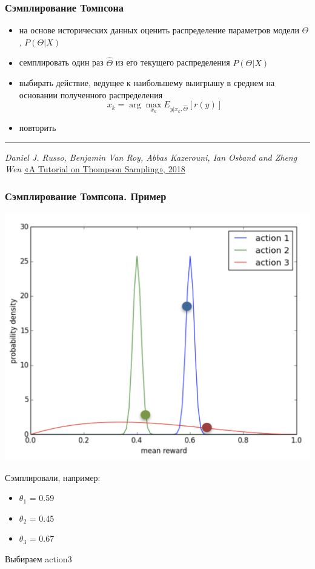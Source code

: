 \documentclass[fullscreen=true, bookmarks=true, hyperref={pdfencoding=unicode}]{beamer}
\begin{document}
\begin{frame}
  \frametitle{Сэмплирование Томпсона}

  \begin{itemize}
    \item на основе исторических данных оценить распределение параметров модели $\Theta$, $P(\Theta|X)$
    \item семплировать один раз $\hat \Theta$ из его текущего распределения $P(\Theta|X)$
    \item выбирать действие, ведущее к наибольшему выигрышу в среднем на основании полученного распределения $$ x_k = \arg\max_{x_k} E_{y|x_k, \hat \Theta} [r(y)]$$
    \item повторить
  \end{itemize}

  \vspace{1cm}

  \noindent\rule{8cm}{0.4pt}

  {\small
  {\it Daniel J. Russo, Benjamin Van Roy, Abbas Kazerouni, Ian Osband and Zheng Wen} \href{https://arxiv.org/pdf/1707.02038.pdf}{«A Tutorial on Thompson Sampling», 2018}}

\end{frame}


\begin{frame}
  \frametitle{Сэмплирование Томпсона. Пример}

  \begin{center}
    \includegraphics[keepaspectratio,
                     width=.5\paperwidth]{thompson_example.png}
  \end{center}

  Сэмплировали, например:
  \begin{itemize}
    \item $\theta_1$ = 0.59
    \item $\theta_2$ = 0.45
    \item $\theta_3$ = 0.67
  \end{itemize}

  Выбираем action3
\end{frame}
\end{document}
